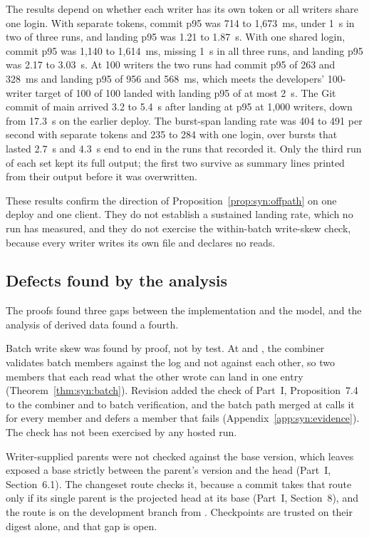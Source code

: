 \documentclass[11pt,letterpaper]{article}
\theoremstyle{definition}
\theoremstyle{remark}
\begin{document}
The results depend on whether each writer has its own token or all writers share one login. With separate tokens, commit p95 was 714 to 1,673~ms, under 1~s in two of three runs, and landing p95 was 1.21 to 1.87~s. With one shared login, commit p95 was 1,140 to 1,614~ms, missing 1~s in all three runs, and landing p95 was 2.17 to 3.03~s. %
At 100 writers the two runs had commit p95 of 263 and 328~ms and landing p95 of 956 and 568~ms, which meets the developers' 100-writer target of 100 of 100 landed with landing p95 of at most 2~s. %
The Git commit of main arrived 3.2 to 5.4~s after landing at p95 at 1,000 writers, down from 17.3~s on the earlier deploy. %
The burst-span landing rate was 404 to 491 per second with separate tokens and 235 to 284 with one login, over bursts that lasted 2.7~s and 4.3~s end to end in the runs that recorded it. %
Only the third run of each set kept its full output; the first two survive as summary lines printed from their output before it was overwritten. %

These results confirm the direction of Proposition~\ref{prop:syn:offpath} on one deploy and one client. They do not establish a sustained landing rate, which no run has measured, and they do not exercise the within-batch write-skew check, because every writer writes its own file and declares no reads.

\subsection{Defects found by the analysis}

The proofs found three gaps between the implementation and the model, and the analysis of derived data found a fourth.

Batch write skew was found by proof, not by test. At  and , the combiner validates batch members against the log and not against each other, so two members that each read what the other wrote can land in one entry (Theorem~\ref{thm:syn:batch}). Revision  added the check of Part~I, Proposition~7.4 to the combiner and to batch verification, and the batch path merged at  calls it for every member and defers a member that fails (Appendix~\ref{app:syn:evidence}). The check has not been exercised by any hosted run.

Writer-supplied parents were not checked against the base version, which leaves exposed a base strictly between the parent's version and the head (Part~I, Section~6.1). The changeset route checks it, because a commit takes that route only if its single parent is the projected head at its base (Part~I, Section~8), and the route is on the development branch from . Checkpoints are trusted on their digest alone, and that gap is open.
\end{document}
